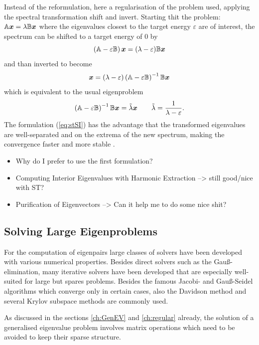 Instead of the reformulation, here a regularisation of the problem used, applying the spectral transformation shift and invert.
Starting thit the problem: $\mathbb{A}\bm{x}=\lambda\mathbb{B}\bm{x}$ where the eigenvalues closest to the target energy $\varepsilon$ are of interest, the spectrum can be shifted to a target energy of $0$ by
\begin{equation}
\left(\mathbb{A}-\varepsilon\mathbb{B}\right)\bm{x}=(\lambda-\varepsilon)\mathbb{B}\bm{x}
\end{equation}
and than inverted to become
\begin{equation}
\bm{x}=(\lambda-\varepsilon)\left(\mathbb{A}-\varepsilon\mathbb{B}\right)^{-1}\mathbb{B}\bm{x}
\end{equation}
which is equivalent to the usual eigenproblem
\begin{equation} \label{eq:stSI}
\left(\mathbb{A}-\varepsilon\mathbb{B}\right)^{-1}\mathbb{B}\bm{x}=\tilde\lambda \bm{x} \qquad \tilde\lambda=\frac{1}{\lambda-\varepsilon}.
\end{equation}
The formulation (\ref{eq:stSI}) has the advantage that the transformed eigenvalues are well-separated and on the extrema of the new spectrum, making the convergence faster and more stable \cite{str-7}.
\begin{itemize}
\item Why do I prefer to use the first formulation?
\item Computing Interior Eigenvalues with Harmonic Extraction --> still good/nice with ST?
\item Purification of Eigenvectors --> Can it help me to do some nice shit?
\end{itemize}

\subsection{Solving Large Eigenproblems}
\label{ch:ghep}
For the computation of eigenpairs large classes of solvers have been developed with various numerical properties.
Besides direct solvers such as the Gau\ss-elimination, many iterative solvers have been developed that are especially well-suited for large but spares problems.
Besides the famous Jacobi- and Gau\ss-Seidel algorithms which converge only in certain cases, also the Davidson method and several Krylov subspace methods are commonly used.

As discussed in the sections \ref{ch:GenEV} and \ref{ch:regular} already, the solution of a generalised eigenvalue problem involves matrix operations which need to be avoided to keep their sparse structure.

